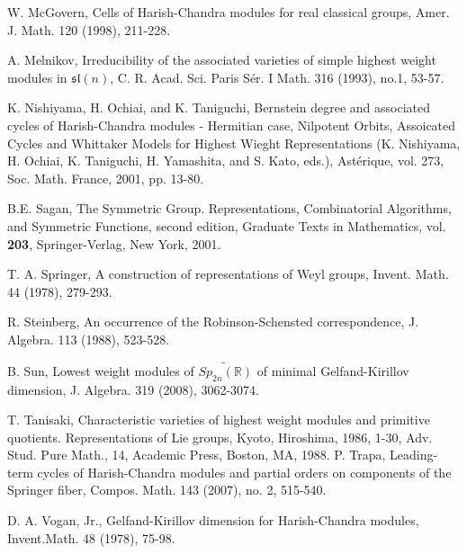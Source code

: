 \documentclass{amsart}[12pt]
\numberwithin{equation}{section}
\begin{document}
\begin{thebibliography}{99}
 W. McGovern, Cells of Harish-Chandra modules for real classical groups, Amer. J. Math. 120
(1998), 211-228.

A. Melnikov,  Irreducibility of the associated varieties of simple highest weight modules in $\mathfrak{sl}(n)$, C. R. Acad. Sci. Paris S\'{e}r. I Math.  316  (1993),  no.1, 53-57.




 K. Nishiyama, H. Ochiai, and K. Taniguchi, Bernstein degree and associated cycles of Harish-Chandra
modules - Hermitian case, Nilpotent Orbits, Assoicated Cycles and Whittaker Models for Highest
Wieght Representations (K. Nishiyama, H. Ochiai, K. Taniguchi, H. Yamashita, and S. Kato, eds.),
Ast\'{e}rique, vol. 273, Soc. Math. France, 2001, pp. 13-80.




 B.E. Sagan, The Symmetric Group. Representations, Combinatorial Algorithms, and Symmetric Functions, second edition, Graduate Texts in Mathematics, vol. {\bf 203}, Springer-Verlag, New York, 2001.





T. A. Springer, A construction of representations of Weyl groups, Invent. Math. 44 (1978), 279-293.

R. Steinberg, An occurrence of the Robinson-Schensted correspondence, J. Algebra. 113 (1988), 523-528.

B. Sun,  Lowest weight modules of $\widetilde{Sp_{2n}(\mathbb{R})}$ of minimal Gelfand-Kirillov dimension,   J. Algebra.  319 (2008), 3062-3074.





T. Tanisaki, Characteristic varieties of highest weight modules and primitive quotients. Representations of Lie groups, Kyoto, Hiroshima, 1986, 1-30, Adv. Stud. Pure Math., 14, Academic Press, Boston, MA, 1988.
P. Trapa, Leading-term cycles of Harish-Chandra modules and partial orders on components of the Springer fiber, Compos. Math. 143 (2007), no. 2, 515-540.

D. A. Vogan, Jr., Gelfand-Kirillov dimension for Harish-Chandra modules,  Invent.Math. 48 (1978), 75-98.


\end{thebibliography}
\end{document}
